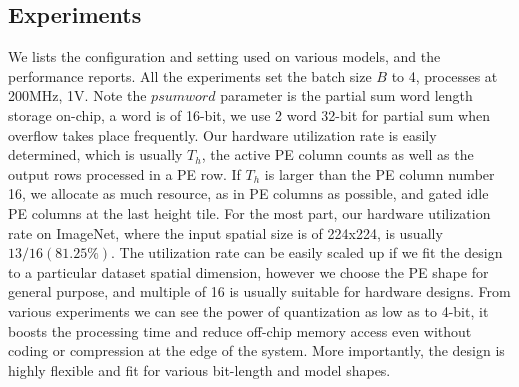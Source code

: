 \begin{table}[h!]
    \caption{Performance summary Batch=4}
    \label{tab:perf_sum}
    \centering
    \footnotesize 
\end{table}
\subsection{Experiments} 
We lists the configuration and setting used on various models, and the performance reports. All the experiments set the batch size $B$ to 4, processes at 200MHz, 1V. Note the $psum word$ parameter is the partial sum word length storage on-chip, a word is of 16-bit, we use 2 word 32-bit for partial sum when overflow takes place frequently. Our hardware utilization rate is easily determined, which is usually $T_h$, the active PE column counts as well as the output rows processed in a PE row. If $T_h$ is larger than the PE column number 16, we allocate as much resource, as in PE columns as possible, and gated idle PE columns at the last height tile. For the most part, our hardware utilization rate on ImageNet, where the input spatial size is of 224x224, is usually $13/16(81.25\%)$. The utilization rate can be easily scaled up if we fit the design to a particular dataset spatial dimension, however we choose the PE shape for general purpose, and multiple of 16 is usually suitable for hardware designs. From various experiments we can see the power of quantization as low as to 4-bit, it boosts the processing time and reduce off-chip memory access even without coding or compression at the edge of the system. More importantly, the design is highly flexible and fit for various bit-length and model shapes. \\

